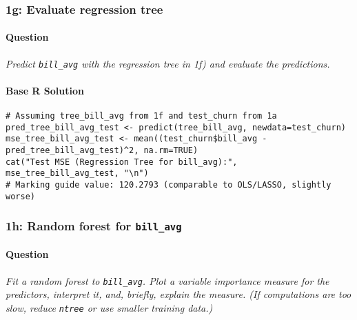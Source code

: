 \documentclass[12pt,a4paper]{article}
\newcommand{\Rcode}[1]{\texttt{#1}} %
\begin{document}
    \subsubsection{1g: Evaluate regression tree}
        \paragraph{Question}
        \textit{Predict \Rcode{bill\_avg} with the regression tree in 1f) and evaluate the predictions.}
        \paragraph{Base R Solution}
\begin{lstlisting}
# Assuming tree_bill_avg from 1f and test_churn from 1a
pred_tree_bill_avg_test <- predict(tree_bill_avg, newdata=test_churn)
mse_tree_bill_avg_test <- mean((test_churn$bill_avg - pred_tree_bill_avg_test)^2, na.rm=TRUE)
cat("Test MSE (Regression Tree for bill_avg):", mse_tree_bill_avg_test, "\n")
# Marking guide value: 120.2793 (comparable to OLS/LASSO, slightly worse)
\end{lstlisting}

    \subsubsection{1h: Random forest for \Rcode{bill\_avg}}
        \paragraph{Question}
        \textit{Fit a random forest to \Rcode{bill\_avg}. Plot a variable importance measure for the predictors, interpret it, and, briefly, explain the measure. (If computations are too slow, reduce \Rcode{ntree} or use smaller training data.)}
\end{document}
